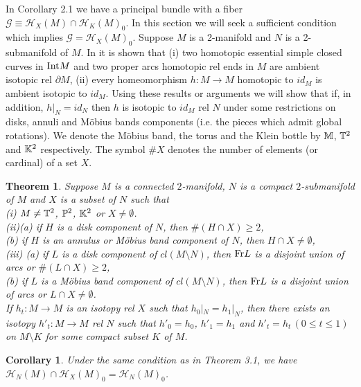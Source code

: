 \documentclass[11pt]{amsart}
\newtheorem{theorem}{Theorem}[section]
\newtheorem{corollary}{Corollary}[section]
\theoremstyle{definition}
\newtheorem*{Proof of Theorem 3.1}{Proof of Theorem 3.1}
\newtheorem*{Proof of Corollary 3.1}{Proof of Corollary 3.1}
\newtheorem*{Proof of Proposition 4.1.(1)}{Proof of Proposition 4.1.(1)}
\newtheorem*{Proof of Proposition 4.1.(2)}{Proof of Proposition 4.1.(2)}
\newtheorem*{Proof of Corollary 1.1}{Proof of Corollary 1.1}
\def \cal {\mathcal}
\begin{document}
In Corollary 2.1 we have a principal bundle with a fiber ${\mathcal G} \equiv {\cal H}_X(M) \cap {\cal H}_K(M)_0$. In this section we will seek a sufficient condition which implies ${\mathcal G} = {\cal H}_X(M)_0$. Suppose $M$ is a 2-manifold and $N$ is a 2-submanifold of $M$. In \cite{Ep} it is shown that (i) two homotopic essential simple closed curves in ${\rm Int}M$ and two proper arcs homotopic rel ends in $M$ are ambient isotopic rel $\partial M$, (ii) every homeomorphism $h : M \to M$ homotopic to $id_M$ is ambient isotopic to $id_M$. Using these results or arguments we will show that if, in addition, $h|_N = id_N$ then $h$ is isotopic to $id_M$ rel $N$ under some restrictions on disks, annuli and M\"obius bands components (i.e. the pieces which admit global rotations). We denote the M\"obius band, the torus and the Klein bottle by ${\Bbb M}$, ${\Bbb T}^2$ and ${\Bbb K}^2$ respectively. The symbol $\#X$ denotes the number of elements (or cardinal) of a set $X$.


\begin{theorem}
Suppose $M$ is a connected $2$-manifold, $N$ is a compact $2$-submanifold of $M$ and $X$ is a subset of $N$ such that \\ {\rm (i)} $M \neq {\Bbb T}^2$, ${\Bbb P}^2$, ${\Bbb K}^2$ or $X \neq \emptyset$. \\
{\rm (ii)}{\rm (a)} if $H$ is a disk component of $N$, then $\# (H \cap X) \geq 2$, \\
{\rm (b)} if $H$ is an annulus or M\"obius band component of $N$, then $H \cap X \neq \emptyset$, \\
{\rm (iii)} {\rm (a)} if $L$ is a disk component of $cl(M \setminus N)$, then ${\rm Fr}L$ is a disjoint union of arcs or $\# (L \cap X) \geq 2$, \\ {\rm (b)} if $L$ is a M\"obius band component of $cl(M \setminus N)$, then ${\rm Fr}L$ is a disjoint union of arcs or $L \cap X \neq \emptyset$. \\ 
If $h_t : M \to M$ is an isotopy rel $X$ such that $h_0|_N = h_1|_N$, then there exists an isotopy $h'_t : M \to M$ rel $N$ such that $h'_0 = h_0$, $h'_1 = h_1$ and $h'_t = h_t \, (0 \leq t \leq 1)$ on $M \setminus K$ for some compact subset $K$ of $M$. 
\end{theorem}

\begin{corollary}
Under the same condition as in Theorem 3.1, we have ${\cal H}_N(M) \cap {\cal H}_X(M)_0 = {\cal H}_N(M)_0$. 
\end{corollary}
\end{document}
